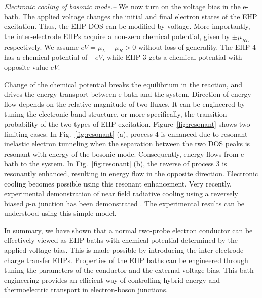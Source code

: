 \documentclass[aps
,twocolumn
,floatfix,footinbib,prl,longbibliography
]{revtex4-1}
\begin{document}
\emph{Electronic cooling of bosonic mode.--}
We now turn on the voltage bias in the e-bath.
The applied voltage changes the initial and final electron states of the EHP excitation. Thus, the EHP DOS can be modified by voltage. More importantly, the inter-electrode EHPs acquire a non-zero chemical potential, given by $\pm \mu_{RL}$ respectively. We assume $eV=\mu_L-\mu_R>0$ without loss of generality. The EHP-4 has a chemical potential of $-eV$, while EHP-3 gets a chemical potential with opposite value $eV$. 

Change of the chemical potential breaks the equilibrium in the reaction, and drives the energy transport between e-bath and the system. 
Direction of energy flow depends on the relative magnitude of two fluxes. It can be engineered by tuning the electronic band structure, or more specifically, the transition probability of the two types of EHP excitation. Figure~\ref{fig:resonant} shows two limiting cases. In Fig.~\ref{fig:resonant} (a), process 4 is enhanced due to resonant inelastic electron tunneling when the separation between the two DOS peaks is resonant with energy of the bosonic mode. Consequently, energy flows from e-bath to the system. In Fig.~\ref{fig:resonant} (b), the reverse of process 3 is resonantly enhanced, resulting in energy flow in the opposite direction. Electronic cooling becomes possible using this resonant enhancement. Very recently, experimental demonstration of near field radiative cooling using a reversely biased $p$-$n$ junction has been demonstrated \cite{zhu2019near}. The experimental results can be understood using this simple model.






In summary, we have shown that a normal two-probe electron conductor can be effectively viewed as EHP baths with chemical potential determined by the applied voltage bias. This is made possible by introducing the inter-electrode charge transfer EHPs. Properties of the EHP baths can be engineered through tuning the parameters of the conductor and the external voltage bias. This bath engineering provides an efficient way of controlling hybrid energy and thermoelectric transport in electron-boson junctions. 
\end{document}
